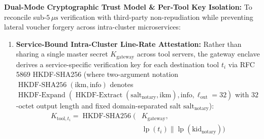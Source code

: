 \documentclass[conference,10pt]{IEEEtran}
\begin{document}
\textbf{Dual-Mode Cryptographic Trust Model \& Per-Tool Key Isolation:} To reconcile sub-$5\,\mu\text{s}$ verification with third-party non-repudiation while preventing lateral voucher forgery across intra-cluster microservices:
\begin{enumerate}
    \item \textbf{Service-Bound Intra-Cluster Line-Rate Attestation:} Rather than sharing a single master secret $K_{\text{gateway}}$ across tool servers, the gateway enclave derives a service-specific verification key for each destination tool $t_i$ via RFC 5869 HKDF-SHA256 (where two-argument notation $\operatorname{HKDF-SHA256}(\text{ikm}, \allowbreak \text{info})$ denotes $\operatorname{HKDF-Expand}(\allowbreak\operatorname{HKDF-Extract}(\text{salt}_{\text{notary}}, \allowbreak \text{ikm}), \allowbreak \text{info}, \ell_{\text{out}} = 32)$ with $32$-octet output length and fixed domain-separated salt $\text{salt}_{\text{notary}}$):
    \begin{equation}
    \begin{split}
    K_{\text{tool}, t_i} = \operatorname{HKDF-SHA256}\big(&K_{\text{gateway}}, \\
    &\operatorname{lp}(t_i) \parallel \operatorname{lp}(\text{kid}_{\text{notary}})\big)
    \end{split}
    \end{equation}

\end{enumerate}
\end{document}
